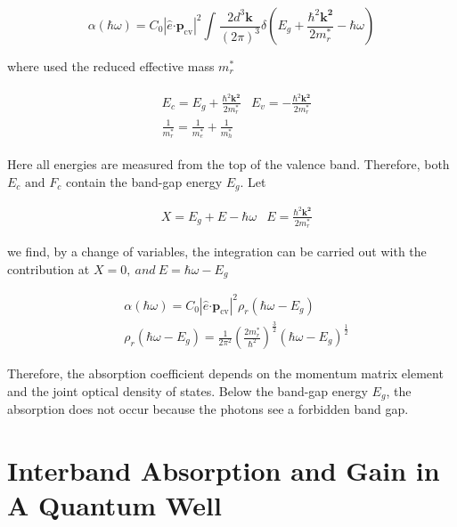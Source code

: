 \begin{equation}
\alpha\left( \hbar\omega \right) = C_{0}\left| \hat{e}\bm{\cdot}\bm{p}_{\text{cv}} \right|^{2}\int_{}^{}\frac{2d^{3}\bm{k}}{\left( 2\pi \right)^{3}}\delta(E_{g} + \frac{\hbar^{2}\bm{k}^{\bm{2}}}{2m_{r}^{*}} - \hbar\omega)
\end{equation}

where used the reduced effective mass \(m_{r}^{*}\)

\begin{eqnarray}
  \begin{aligned}
  & E_{c} = E_{g} + \frac{\hbar^{2}\bm{k}^{\bm{2}}}{2m_{r}^{*}}
  & E_{v} = - \frac{\hbar^{2}\bm{k}^{\bm{2}}}{2m_{r}^{*}} \nonumber \\
  & \frac{1}{m_{r}^{*}} = \frac{1}{m_{e}^{*}} + \frac{1}{m_{h}^{*}} 
  \end{aligned}
\end{eqnarray}

Here all energies are measured from the top of the valence band.
Therefore, both \(E_{c}\text{\ and\ }F_{c}\) contain the band-gap energy
\(E_{g}\). Let

\begin{eqnarray}
  & X = E_{g} + E - \hbar\omega
  & E = \frac{\hbar^{2}\bm{k}^{\bm{2}}}{2m_{r}^{*}}
\end{eqnarray}

we find, by a change of variables, the integration can be carried out
with the contribution at \(X = 0,\ and\ E = {\hbar\omega - E}_{g}\)

\begin{eqnarray}
  & \alpha\left( \hbar\omega \right) = C_{0}\left| \hat{e}\bm{\cdot}\bm{p}_{\text{cv}} \right|^{2}\rho_{r}\left( {\hbar\omega - E}_{g} \right)  \\
  & \rho_{r}\left( {\hbar\omega - E}_{g} \right) = \frac{1}{2\pi^{2}}{(\frac{2m_{r}^{*}}{\hbar^{2}})}^{\frac{3}{2}}\left( {\hbar\omega - E}_{g} \right)^{\frac{1}{2}}
\end{eqnarray}

Therefore, the absorption coefficient depends on the momentum matrix
element and the joint optical density of states. Below the band-gap
energy \(E_{g}\), the absorption does not occur because the photons see
a forbidden band gap.

\section{Interband Absorption and Gain in A Quantum
Well}\label{interband-absorption-and-gain-in-a-quantum-well}

